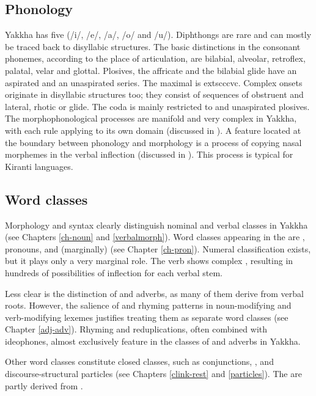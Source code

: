 \subsection{Phonology}

Yakkha has five  (/i/, /e/, /a/, /o/ and /u/). Diphthongs are rare and can mostly be traced back to disyllabic structures. The basic distinctions in the consonant phonemes, according to  the place of articulation, are bilabial, alveolar, retroflex, palatal, velar and glottal. Plosives, the affricate and the bilabial glide have an aspirated and an unaspirated series. The maximal  is 	extsc{ccvc}. Complex onsets originate in disyllabic structures too; they consist of sequences of obstruent and lateral, rhotic or glide. The  coda is mainly restricted to  and unaspirated plosives. The morphophonological processes are manifold and very complex in Yakkha, with each rule applying to its own domain (discussed in ). A feature located at the boundary between phonology and morphology is a process of copying nasal morphemes in the verbal inflection (discussed in ). This process is typical for Kiranti languages.


\subsection{Word classes}

Morphology and syntax clearly distinguish nominal and verbal classes in Yakkha (see Chapters \ref{ch-noun} and \ref{verbalmorph}). Word classes appearing in the  are , pronouns,   and (marginally)  (see Chapter \ref{ch-pron}). Numeral classification exists, but it plays only a very marginal role. The verb shows complex , resulting in hundreds of possibilities of inflection for each verbal stem. 


Less clear is the distinction of  and adverbs, as many of them derive from verbal roots. However, the salience of  and rhyming patterns in noun-modifying and verb-modifying lexemes justifies treating them as separate word classes (see Chapter \ref{adj-adv}). Rhyming and reduplications, often combined with ideophones, almost exclusively feature in the classes of  and adverbs in Yakkha.


Other word classes constitute closed classes, such as conjunctions, ,  and discourse-structural particles (see Chapters  \ref{clink-rest} and \ref{particles}). The  are partly derived from . 


